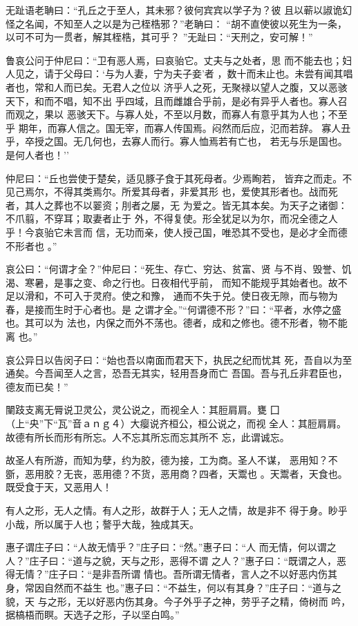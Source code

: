 \documentclass[]{article}
\begin{document}
无趾语老聃曰：``孔丘之于至人，其未邪？彼何宾宾以学子为？彼
且以蕲以諔诡幻怪之名闻，不知至人之以是为己桎梏邪？''老聃曰：
``胡不直使彼以死生为一条，以可不可为一贯者，解其桎梏，其可乎？
''无趾曰：``天刑之，安可解！''

鲁哀公问于仲尼曰：``卫有恶人焉，曰哀骀它。丈夫与之处者，思
而不能去也；妇人见之，请于父母曰：`与为人妻，宁为夫子妾'者
，数十而未止也。未尝有闻其唱者也，常和人而已矣。无君人之位以
济乎人之死，无聚禄以望人之腹，又以恶骇天下，和而不唱，知不出
乎四域，且而雌雄合乎前，是必有异乎人者也。寡人召而观之，果以
恶骇天下。与寡人处，不至以月数，而寡人有意乎其为人也；不至乎
期年，而寡人信之。国无宰，而寡人传国焉。闷然而后应，氾而若辞。
寡人丑乎，卒授之国。无几何也，去寡人而行。寡人恤焉若有亡也，
若无与乐是国也。是何人者也！''

仲尼曰：``丘也尝使于楚矣，适见豚子食于其死母者。少焉眴若，
皆弃之而走。不见己焉尔，不得其类焉尔。所爱其母者，非爱其形
也，爱使其形者也。战而死者，其人之葬也不以翣资；刖者之屡，无
为爱之。皆无其本矣。为天子之诸御：不爪翦，不穿耳；取妻者止于
外，不得复使。形全犹足以为尔，而况全德之人乎！今哀骀它未言而
信，无功而亲，使人授己国，唯恐其不受也，是必才全而德不形者也 。''

哀公曰：``何谓才全？''仲尼曰：``死生、存亡、穷达、贫富、贤
与不肖、毁誉、饥渴、寒暑，是事之变、命之行也。日夜相代乎前，
而知不能规乎其始者也。故不足以滑和，不可入于灵府。使之和豫，
通而不失于兑。使日夜无隙，而与物为春，是接而生时于心者也。是
之谓才全。''``何谓德不形？''曰：``平者，水停之盛也。其可以为
法也，内保之而外不荡也。德者，成和之修也。德不形者，物不能离 也。''

哀公异日以告闵子曰：``始也吾以南面而君天下，执民之纪而忧其
死，吾自以为至通矣。今吾闻至人之言，恐吾无其实，轻用吾身而亡
吾国。吾与孔丘非君臣也，德友而已矣！''

闉跂支离无脣说卫灵公，灵公说之，而视全人：其脰肩肩。甕
囗（上``央''下``瓦''音ａｎｇ４）大瘿说齐桓公，桓公说之，而视
全人：其脰肩肩。故德有所长而形有所忘。人不忘其所忘而忘其所不
忘，此谓诚忘。

故圣人有所游，而知为孽，约为胶，德为接，工为商。圣人不谋，
恶用知？不斵，恶用胶？无丧，恶用德？不货，恶用商？四者，天鬻也
。天鬻者，天食也。既受食于天，又恶用人！

有人之形，无人之情。有人之形，故群于人；无人之情，故是非不
得于身。眇乎小哉，所以属于人也；謷乎大哉，独成其天。

惠子谓庄子曰：``人故无情乎？''庄子曰：``然。''惠子曰：``人
而无情，何以谓之人？''庄子曰：``道与之貌，天与之形，恶得不谓
之人？''惠子曰：``既谓之人，恶得无情？''庄子曰：``是非吾所谓
情也。吾所谓无情者，言人之不以好恶内伤其身，常因自然而不益生
也。''惠子曰：``不益生，何以有其身？''庄子曰：``道与之貌，天
与之形，无以好恶内伤其身。今子外乎子之神，劳乎子之精，倚树而
吟，据槁梧而瞑。天选子之形，子以坚白鸣。''
\end{document}
